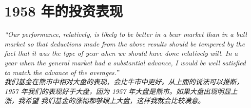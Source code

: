 \section{1958 年的投资表现}

\begin{verseparallel}
  {
  }
  {
  }
\end{verseparallel}

\begin{verseparallel}
    { 
      \hspace{-0.9em}
      \textit{
      “Our performance, relatively, is likely to be better in a bear market
      than in a bull market so that deductions made from the above results
      should be tempered by the fact that it was the type of year when we should
      have done relatively will. In a year when the general market had a
      substantial advance, I would be well satisfied to match the advance of the
      averages.” \\
      }
    }
    {
      \hspace{-0.6em}
      \textit{
      我们基金在熊市中相对大盘的表现，会比牛市中更好。从上面的说法可以推断，1957
      年我们的表现好于大盘，因为 1957 年大盘是熊市。如果大盘出现明显上涨，我希望
      我们基金的涨幅都够跟上大盘，这样我就会比较满意。
      }
    }
\end{verseparallel}
  
